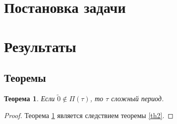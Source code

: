 \documentclass[bibliography=totoc, a4paper, 14pt]{extarticle}
\let\stdsection\section
\renewcommand\section{\newpage\stdsection}
\newtheorem{myth}{Теорема}
\begin{document}

\section{Постановка задачи}

\section{Результаты}
\subsection{Теоремы}
\begin{myth}
\label{th1}
Если $\tilde{0} \not\in \Pi(\tau)$, то $\tau$ сложный период.
\end{myth}
\begin{proof}
Теорема \ref{th1} является следствием теоремы \ref{th2}.
\end{proof}
\end{document}
